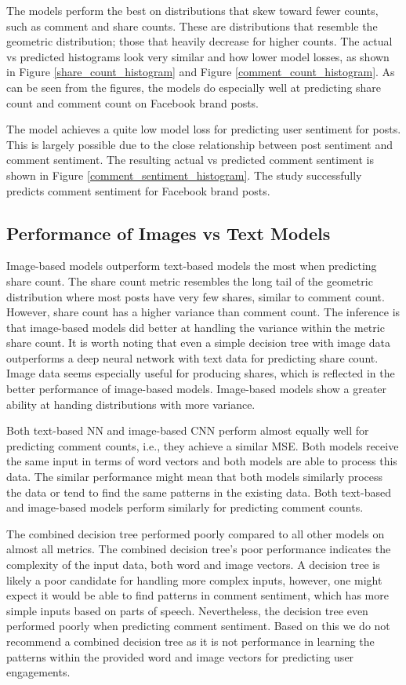\documentclass[mksc,blindrev]{informs3} %
\begin{document}
The models perform the best on distributions that skew toward fewer counts, such as comment and share counts. These are distributions that resemble the geometric distribution; those that heavily decrease for higher counts. The actual vs predicted histograms look very similar and how lower model losses, as shown in Figure \ref{share_count_histogram} and Figure \ref{comment_count_histogram}. As can be seen from the figures, the models do especially well at predicting share count and comment count on Facebook brand posts.

The model achieves a quite low model loss for predicting user sentiment for posts. This is largely possible due to the close relationship between post sentiment and comment sentiment. The resulting actual vs predicted comment sentiment is shown in Figure \ref{comment_sentiment_histogram}. The study successfully predicts comment sentiment for Facebook brand posts.

\subsection{Performance of Images vs Text Models}

Image-based models outperform text-based models the most when predicting share count. The share count metric resembles the long tail of the geometric distribution where most posts have very few shares, similar to comment count. However, share count has a higher variance than comment count. The inference is that image-based models did better at handling the variance within the metric share count. It is worth noting that even a simple decision tree with image data outperforms a deep neural network with text data for predicting share count. Image data seems especially useful for producing shares, which is reflected in the better performance of image-based models. Image-based models show a greater ability at handing distributions with more variance.

Both text-based NN and image-based CNN perform almost equally well for predicting comment counts, i.e., they achieve a similar MSE. Both models receive the same input in terms of word vectors and both models are able to process this data. The similar performance might mean that both models similarly process the data or tend to find the same patterns in the existing data. Both text-based and image-based models perform similarly for predicting comment counts.

The combined decision tree performed poorly compared to all other models on almost all metrics. The combined decision tree's poor performance indicates the complexity of the input data, both word and image vectors. A decision tree is likely a poor candidate for handling more complex inputs, however, one might expect it would be able to find patterns in comment sentiment, which has more simple inputs based on parts of speech. Nevertheless, the decision tree even performed poorly when predicting comment sentiment. Based on this we do not recommend a combined decision tree as it is not performance in learning the patterns within the provided word and image vectors for predicting user engagements.
\end{document}

